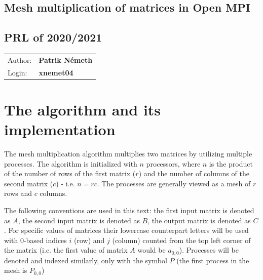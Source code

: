 \documentclass[pdftex, 11pt, a4paper, titlepage]{article}
\begin{document}
    \begin{center}
        \section*{Mesh multiplication of matrices in Open MPI}
        \subsection*{PRL of 2020/2021}
        \begin{tabular}{ l l }
            Author: & \textbf{Patrik Németh} \\
            Login: & \textbf{xnemet04}
        \end{tabular}
    \end{center}

    \section{The algorithm and its implementation}
    The mesh multiplication algorithm multiplies two matrices by utilizing multiple
    processes.
    The algorithm is initialized with $n$ processors, where $n$ is the product of
    the number of rows of the first matrix ($r$) and the number of columns of the
    second matrix ($c$) - i.e. $n = rc$. The processes are generally viewed as
    a mesh of $r$ rows and $c$ columns.

    The following conventions are used in this text: the first input matrix is
    denoted as $A$, the second input matrix is denoted as $B$, the output matrix
    is denoted as $C$. For specific values of matrices their lowercase counterpart
    letters will be used with $0$-based indices $i$ (row) and $j$ (column) counted
    from the top left corner of the matrix (i.e. the first value of matrix $A$ would
    be $a_{0,0}$). Processes will be denoted and indexed similarly, only with the
    symbol $P$ (the first process in the mesh is $P_{0,0}$)
\end{document}
